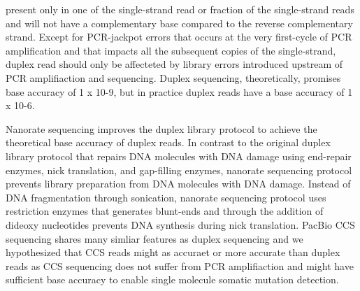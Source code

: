 present only in one of the single-strand read or fraction of the single-strand reads and will not have a complementary base compared to the reverse complementary strand. Except for PCR-jackpot errors that occurs at the very first-cycle of PCR amplification and that impacts all the subsequent copies of the single-strand, duplex read should only be affecteted by library errors introduced upstream of PCR amplifiaction and sequencing. Duplex sequencing, theoretically, promises base accuracy of 1 x 10-9, but in practice duplex reads have a base accuracy of 1 x 10-6. 

Nanorate sequencing improves the duplex library protocol to achieve the theoretical base accuracy of duplex reads. In contrast to the original duplex library protocol that repairs DNA molecules with DNA damage using end-repair enzymes, nick translation, and gap-filling enzymes, nanorate sequencing protocol prevents library preparation from DNA molecules with DNA damage. Instead of DNA fragmentation through sonication, nanorate sequencing protocol uses restriction enzymes that generates blunt-ends and through the addition of dideoxy nucleotides prevents DNA synthesis during nick translation. PacBio CCS sequencing shares many simliar features as duplex sequencing and we hypothesized that CCS reads might as accuraet or more accurate than duplex reads as CCS sequencing does not suffer from PCR amplifiaction and might have sufficient base accuracy to enable single molecule somatic mutation detection.


